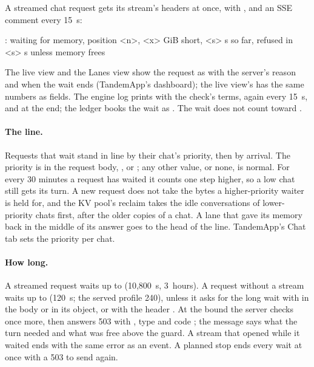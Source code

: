 A streamed chat request gets its stream's headers at once, with , and an SSE comment every 15~s:

\begin{plain}
: waiting for memory, position <n>, <x> GiB short, <s> s so far, refused in <s> s unless memory frees
\end{plain}

The live view and the Lanes view show the request as  with the server's reason and when the wait ends (TandemApp's dashboard); the live view's  has the same numbers as fields. The engine log prints  with the check's terms, again every 15~s, and  at the end; the ledger books the wait as . The wait does not count toward .

\paragraph{The line.} Requests that wait stand in line by their chat's priority, then by arrival. The priority is  in the request body, ,  or ; any other value, or none, is normal. For every 30 minutes a request has waited it counts one step higher, so a low chat still gets its turn. A new request does not take the bytes a higher-priority waiter is held for, and the KV pool's reclaim takes the idle conversations of lower-priority chats first, after the older copies of a chat. A lane that gave its memory back in the middle of its answer goes to the head of the line. TandemApp's Chat tab sets the priority per chat.

\paragraph{How long.} A streamed request waits up to  (10,800~s, 3~hours). A request without a stream waits up to  (120~s; the served profile 240), unless it asks for the long wait with  in the body or in its  object, or with the header . At the bound the server checks once more, then answers 503 with , type  and code ; the message says what the turn needed and what was free above the guard. A stream that opened while it waited ends with the same error as an event. A planned stop ends every wait at once with a 503 to send again.

